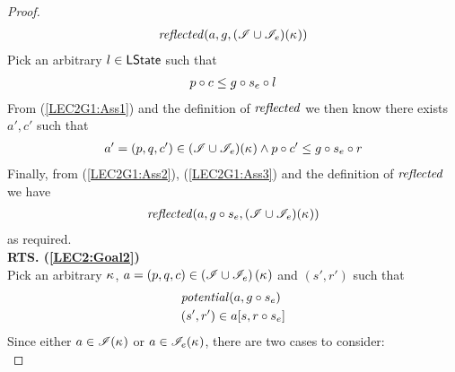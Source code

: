 \begin{lemma}
\begin{proof}
%
\begin{align}
	\mathit{reflected}(a, g, (\mathscr{I} \cup \mathscr{I}_e)(\kappa_{})) \label{LEC2G1:Ass1}
\end{align} 
%
Pick an arbitrary $l \in \textsf{LState}$ such that
%
\begin{align}
	p \circ c \leq g \circ s_e \circ l \label{LEC2G1:Ass2}
\end{align}
%
From (\ref{LEC2G1:Ass1}) and the definition of $\mathit{reflected}$ we then know there exists $a', c'$ such that
%
\begin{align}
	a' = (p, q, c') \in (\mathscr{I} \cup \mathscr{I}_e)(\kappa_{}) \land p \circ c' \leq g \circ s_e \circ r \label{LEC2G1:Ass3}
\end{align}
%
Finally, from (\ref{LEC2G1:Ass2}), (\ref{LEC2G1:Ass3}) and the definition of $\mathit{reflected}$ we have
%
\begin{align*}
	\mathit{reflected}(a, g \circ s_e, (\mathscr{I} \cup \mathscr{I}_e)(\kappa_{}))
\end{align*}
% 
as required.\\

\noindent\textbf{RTS. (\ref{LEC2:Goal2})}\\
Pick an arbitrary $\kappa_{}$, $a = (p, q, c) \in \left(\mathscr{I} \cup \mathscr{I}_e \right)(\kappa_{})$ and $(s', r')$ such that
%
\begin{align}
	& \mathit{potential}(a, g \circ s_e) \label{LEC2:Ass5}\\
	& (s', r') \in a[s, r \circ s_e] \label{LEC2:Ass6}
\end{align}
Since either $a \in \mathscr{I}(\kappa_{})$ or $a \in \mathscr{I}_e(\kappa_{})$, there are two cases to consider:\\


\end{proof}
\end{lemma}
